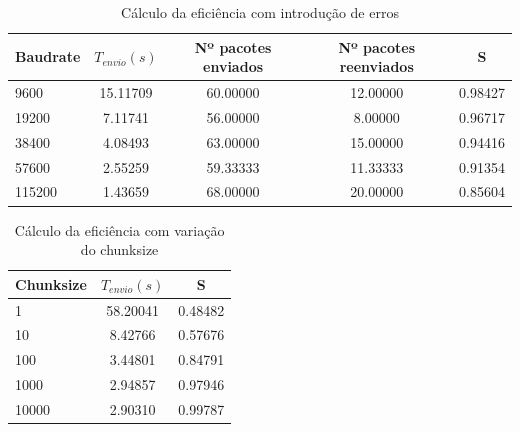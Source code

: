 \documentclass[11pt]{report}
\begin{document}
\begin{table}[h!]
  \begin{center}
    \caption{Cálculo da eficiência com introdução de erros}
    \label{tab:table1}
    \begin{tabular}{l|c|c|c|c} %
        Baudrate & \textbf{$  T_{envio} (s) $} & Nº pacotes enviados & Nº pacotes reenviados & S\\
      \hline
        9600 & 15.11709 & 60.00000 & 12.00000 & 0.98427\\
        19200 & 7.11741 & 56.00000 & 8.00000 & 0.96717\\
        38400 & 4.08493 & 63.00000 & 15.00000 & 0.94416\\
        57600 & 2.55259 & 59.33333 & 11.33333 & 0.91354\\
        115200 & 1.43659 & 68.00000 & 20.00000 & 0.85604\\
    \end{tabular}
  \end{center}
\end{table}

\begin{table}[h!]
  \begin{center}
    \caption{Cálculo da eficiência com variação do chunksize}
    \label{tab:table1}
    \begin{tabular}{l|c|c} %
        Chunksize & \textbf{$  T_{envio} (s) $} & S \\
      \hline
        1 & 58.20041 & 0.48482 \\
        10 & 8.42766 & 0.57676\\
        100 & 3.44801 & 0.84791\\
        1000 & 2.94857 & 0.97946\\
        10000 & 2.90310 & 0.99787\\
    \end{tabular}
  \end{center}
\end{table}
\end{document}
